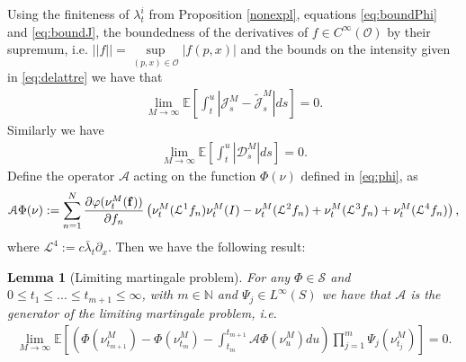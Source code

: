 \documentclass[10pt]{article}
\theoremstyle{plain}
\newtheorem{lemma}[theorem]{Lemma}                              %
\theoremstyle{definition}
\newcommand{\<}{\langle}
\renewcommand{\>}{\rangle}
\renewcommand{\(}{\left(}
\renewcommand{\)}{\right)}
\renewcommand{\[}{\left[}
\renewcommand{\]}{\right]}
\newcommand{\blu}[1]{\textcolor{blue}{#1}}
\def \phi {{\varphi}}
\begin{document}
Using the finiteness of $\lambda_t^i$ from Proposition \ref{nonexpl}, equations \eqref{eq:boundPhi} and \eqref{eq:boundJ}, the boundedness of the derivatives of $f\in C^\infty(\mathcal{O})$ by their supremum, i.e. $||f||=\sup\limits_{(p,x)\in\mathcal{O}} |f(p,x)|$ and the bounds on the intensity given in \eqref{eq:delattre} we have that %
\begin{align}
\lim\limits_{M\rightarrow\infty}\mathbb{E}\left[\int_t^u|\mathcal{J}_s^{M}-\mathcal{\tilde
J}_s^M|ds\right] =0.
\end{align}
Similarly we have %
\begin{align}
\lim\limits_{M\rightarrow\infty}\mathbb{E}\left[\int_t^u|\mathcal{D}_s^M|ds\right]=0.
\end{align}
Define the operator $\mathcal{A}$ acting on the function $\Phi(\nu)$ defined in \eqref{eq:phi}, as
\begin{align}\label{eq:generator}
\mathcal{A}\Phi(\nu):=\sum\limits_{n=1}^N\frac{\partial\phi(\nu_t^M(\bold{f}))}{\partial
f_n}\left(\nu_t^M(\mathcal{L}^1f_n)\nu_t^M(I)-\nu_t^M(\mathcal{L}^2f_n)+\nu_t^M(\mathcal{L}^3f_n)+\nu_t^M(\mathcal{L}^4f_n)\right),
\end{align}
where $\mathcal{L}^4:=c\bar\lambda_t\partial_x.$ Then 
we have the following result:
\begin{lemma}[Limiting martingale problem]\label{lemma1} For any $\Phi\in\mathcal{S}$ and $0\leq t_1\leq ...\leq t_{m+1}\leq\infty$, with $m\in\mathbb{N}$ and $\Psi_j\in L^{\infty}(S)$ we have that $\mathcal{A}$ is the generator of the limiting martingale problem, i.e.
\begin{align}\label{eq:limmart}
\lim\limits_{M\rightarrow\infty}\mathbb{E}\left[\left(\Phi(\nu_{t_{m+1}}^M)-\Phi(\nu_{t_m}^M)-\int_{t_m}^{t_{m+1}}\mathcal{A}\Phi(\nu_u^M)du\right)\prod_{j=1}^m\Psi_j(\nu_{t_j}^M)\right]=0.
\end{align}
\end{lemma}
\end{document}
